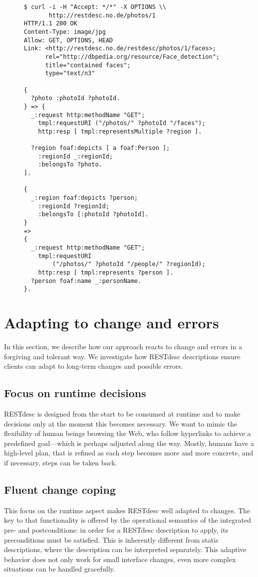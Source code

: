 \documentclass[smallextended]{svjour3}
\begin{document}
{\begin{figure}
\begin{lstlisting}[caption=An OPTIONS call to find out about one's options with a concrete photo, label=lst:PhotoOPTIONS, escapechar=§]
$ curl -i -H "Accept: */*" -X OPTIONS \\
       http://restdesc.no.de/photos/1
HTTP/1.1 200 OK
Content-Type: image/jpg
Allow: GET, OPTIONS, HEAD
Link: <http://restdesc.no.de/restdesc/photos/1/faces>;
      rel="http://dbpedia.org/resource/Face_detection";
      title="contained faces";
      type="text/n3"

{
  ?photo :photoId ?photoId.
} => {
  _:request http:methodName "GET";
    tmpl:requestURI ("/photos/" ?photoId "/faces");
    http:resp [ tmpl:representsMultiple ?region ].
    
  ?region foaf:depicts [ a foaf:Person ];
    :regionId _:regionId;
    :belongsTo ?photo.    
].

{
  _:region foaf:depicts ?person;
    :regionId ?regionId;
    :belongsTo [:photoId ?photoId].
}
=>
{
  _:request http:methodName "GET";
    tmpl:requestURI
        ("/photos/" ?photoId "/people/" ?regionId);
    http:resp [ tmpl:represents ?person ].
  ?person foaf:name _:personName.
}.
\end{lstlisting}
\end{figure}


\section{Adapting to change and errors} \label{sec:adapting-to-change-and-errors}
In this section, we describe how our approach reacts to change and errors in a forgiving and tolerant way. We investigate how RESTdesc descriptions ensure clients can adapt to long-term changes and possible errors.

\subsection{Focus on runtime decisions}
RESTdesc is designed from the start to be consumed at runtime and to make decisions only at the moment this becomes necessary. We want to mimic the flexibility of human beings browsing the Web, who follow hyperlinks to achieve a predefined goal---which is perhaps adjusted along the way. Mostly, humans have a high-level plan, that is refined as each step becomes more and more concrete, and if necessary, steps can be taken back.

\subsection{Fluent change coping}
This focus on the runtime aspect makes RESTdesc well adapted to changes. The key to that functionality is offered by the operational semantics of the integrated pre- and postconditions: in order for a RESTdesc description to apply, its preconditions must be satisfied. This is inherently different from static descriptions, where the description can be interpreted separately. This adaptive behavior does not only work for small interface changes, even more complex situations can be handled gracefully.

}
\end{document}
